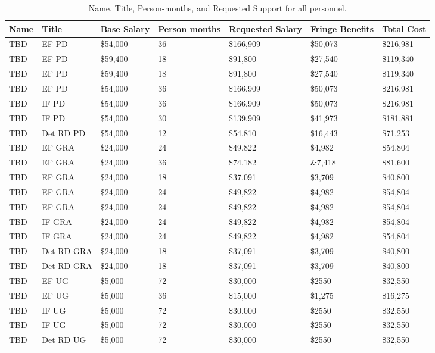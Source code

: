 \documentclass[11pt]{article}
\begin{document}
\begin{table}[htb]
\centering
\begin{tabular}{ || l || l |  p{1.7cm} | p{1.7cm} | p{1.7cm} || p{1.7cm} | p{1.8cm} || }
\hline\hline\hline
\textbf{Name} & \textbf{Title} & \textbf{Base Salary} & \textbf{Person months} & \textbf{Requested Salary} & \textbf{Fringe Benefits} & \textbf{Total Cost} \\ \hline\hline
TBD & EF PD & \$54,000 & 36 & \$166,909 & \$50,073 & \$216,981 \\ \hline
TBD & EF PD & \$59,400 & 18 & \$91,800 & \$27,540 & \$119,340 \\ \hline
TBD & EF PD & \$59,400 & 18 & \$91,800 & \$27,540 & \$119,340 \\ \hline
TBD & EF PD & \$54,000 & 36 & \$166,909 & \$50,073 & \$216,981 \\ \hline
TBD & IF PD & \$54,000 & 36 & \$166,909 & \$50,073 & \$216,981 \\ \hline
TBD & IF PD & \$54,000 & 30 & \$139,909 & \$41,973 & \$181,881 \\ \hline
TBD & Det RD PD & \$54,000 & 12 & \$54,810 & \$16,443 & \$71,253  \\ \hline
TBD & EF GRA & \$24,000 & 24 & \$49,822 & \$4,982 & \$54,804 \\ \hline
TBD & EF GRA & \$24,000 & 36 & \$74,182 & \&7,418 & \$81,600 \\ \hline
TBD & EF GRA & \$24,000 & 18 & \$37,091 & \$3,709 & \$40,800 \\ \hline
TBD & EF GRA & \$24,000 & 24 & \$49,822 & \$4,982 & \$54,804 \\ \hline
TBD & EF GRA & \$24,000 & 24 & \$49,822 & \$4,982 & \$54,804 \\ \hline
TBD & IF GRA & \$24,000 & 24 & \$49,822 & \$4,982 & \$54,804 \\ \hline
TBD & IF GRA & \$24,000 & 24 & \$49,822 & \$4,982 & \$54,804 \\ \hline
TBD & Det RD GRA & \$24,000 & 18 & \$37,091 & \$3,709 & \$40,800 \\ \hline
TBD & Det RD GRA & \$24,000 & 18 & \$37,091 & \$3,709 & \$40,800 \\ \hline
TBD & EF UG & \$5,000 & 72 & \$30,000 & \$2550 & \$32,550 \\ \hline
TBD & EF UG & \$5,000 & 36 & \$15,000 & \$1,275 & \$16,275 \\ \hline
TBD & IF UG & \$5,000 & 72 & \$30,000 & \$2550 & \$32,550 \\ \hline
TBD & IF UG & \$5,000 & 72 & \$30,000 & \$2550 & \$32,550 \\ \hline
TBD & Det RD UG & \$5,000 & 72 & \$30,000 & \$2550 & \$32,550 \\ \hline
\hline\hline\hline
\end{tabular}
\caption{Name, Title, Person-months, and Requested Support for all personnel.}
\end{table}
\end{document}
